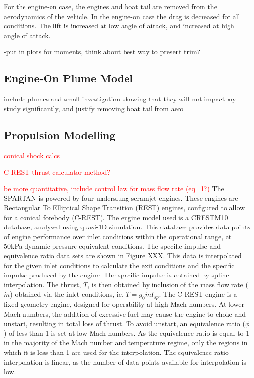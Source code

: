 For the engine-on case, the engines and boat tail are removed from the aerodynamics of the vehicle. In the engine-on case the drag is decreased for all conditions. The lift is increased at low angle of attack, and increased at high angle of attack.


-put in plots for moments, think about best way to present trim?

\subsection{Engine-On Plume Model}

include plumes and small investigation showing that they will not impact my study significantly, and justify removing boat tail from aero


		
		\subsection{Propulsion Modelling}
		
		\textcolor{red}{conical shock calcs}
		
		\textcolor{red}{C-REST thrust calculator method?}
		
		\textcolor{red}{be more quantitative, include control law for mass flow rate (eq=1?)}
		The SPARTAN is powered by four underslung scramjet engines. These engines are Rectangular To Elliptical Shape Transition (REST) engines, configured to allow for a conical forebody (C-REST). The engine model used is a CRESTM10 database\cite{Preller2017}, analysed using quasi-1D simulation.
	This database provides data points of engine performance over inlet conditions within the operational range, at 50kPa dynamic pressure equivalent conditions. The specific impulse and equivalence ratio data sets are shown in Figure XXX. This data is interpolated for the given inlet conditions to calculate the exit conditions and the specific impulse produced by the engine. The specific impulse is obtained by spline interpolation. The thrust, $T$, is then obtained by inclusion of the mass flow rate ($\dot{m}$) obtained via the inlet conditions, ie. $T = g_0\dot{m}I_{sp}$.
	The C-REST engine is a fixed geometry engine, designed for operability at high Mach numbers\cite{Preller2017}. At lower Mach numbers, the addition of excessive fuel may cause the engine to choke and unstart, resulting in total loss of thrust\cite{Preller2017}. To avoid unstart, an equivalence ratio ($\phi$) of less than 1 is set at low Mach numbers. As the equivalence ratio is equal to 1 in the majority of the Mach number and temperature regime, only the regions in which it is less than 1 are used for the interpolation. The equivalence ratio interpolation is linear, as the number of data points available for interpolation is low. 
	
